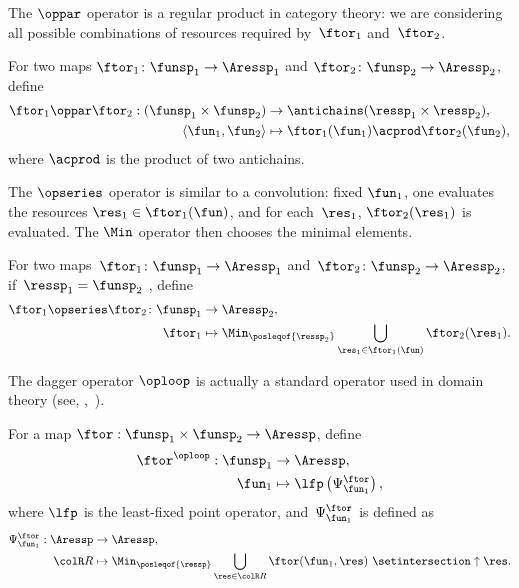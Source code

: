 The $\oppar$ operator is a regular product in category theory: we
are considering all possible combinations of resources required by~$\ftor_{1}$
and~$\ftor_{2}$.
\begin{definition}
	\label{def:opmaps}
	For two maps $\ftor_{1}\colon\funsp_{1}\rightarrow\Aressp_{1}$
	and $\ftor_{2}\colon\funsp_{2}\rightarrow\Aressp_{2}$, define
	\begin{align*}
		\ftor_{1}\oppar\ftor_{2}:(\funsp_{1}\times\funsp_{2}) & \rightarrow\antichains(\ressp_{1}\times\ressp_{2}),   \\
		\left\langle \fun_{1},\fun_{2}\right\rangle           & \mapsto\ftor_{1}(\fun_{1})\acprod\ftor_{2}(\fun_{2}),
	\end{align*}
	where $\acprod$ is the product of two antichains.
\end{definition}
The $\opseries$ operator is similar to a convolution: fixed $\fun_{1}$,
one evaluates the resources $\res_{1}\in\ftor_{1}(\fun)$, and for
each~$\res_{1}$, $\ftor_{2}(\res_{1})$ is evaluated.
The $\Min$
operator then chooses the minimal elements.
\begin{definition}
	\label{def:opseries}
	For two maps~$\ftor_{1}\colon\funsp_{1}\rightarrow\Aressp_{1}$
	and~$\ftor_{2}\colon\funsp_{2}\rightarrow\Aressp_{2}$, if~$\ressp_{1}=\funsp_{2}$
	, define
	\begin{align*}
		{\displaystyle \ftor_{1}\opseries\ftor_{2}\colon\funsp_{1}}
		          & \rightarrow\Aressp_{2},                                                                     \\
		\ftor_{1} & \mapsto\Min_{\posleqof{\ressp_{2}}}\bigcup_{\res_{1}\in\ftor_{1}(\fun)}\ftor_{2}(\res_{1}).
	\end{align*}

\end{definition}

The dagger operator $\oploop$ is actually a standard operator used
in domain theory (see, \eg ,~\cite[II-2.29]{gierz03continuous}).
\begin{definition}
	\label{def:oploop}
	For a map $\ftor:\funsp_{1}\times\funsp_{2}\rightarrow\Aressp$,
	define
	\begin{align}
		\ftor^{\oploop}:\funsp_{1} & \rightarrow\Aressp,\nonumber                     \\
		\fun_{1}                   & \mapsto\lfp\left(\Psi_{\fun_{1}}^{\ftor}\right),
	\end{align}
	where $\lfp$ is the least-fixed point operator, and~$\Psi_{\fun_{1}}^{\ftor}$
	is defined as
	\begin{align*}
		\Psi_{\fun_{1}}^{\ftor}:\Aressp & \rightarrow\Aressp,                                                                                          \\
		{\colR R}                       & \mapsto\Min_{\posleqof{\ressp}}\bigcup_{\res\in{\colR R}}\ftor(\fun_{1},\res)\ \setintersection\uparrow\res.
	\end{align*}
\end{definition}


